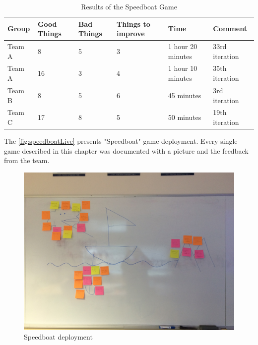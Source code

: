 \begin{table}[!htbp]
	\caption{Results of the Speedboat Game}
	\label{tab:groups-speedTeamResultsN}
	\begin{tabularx}{\textwidth}{|X|X|X|X|X|X|}
	\hline
		Group & Good Things & Bad Things & Things to improve & Time & Comment\\ \hline
		Team A & 8 & 5 & 3 & 1 hour 20 minutes & 33rd iteration \\ \hline
		Team A & 16 & 3 & 4 & 1 hour 10 minutes & 35th iteration\\ \hline
		Team B & 8 & 5 & 6 & 45 minutes & 3rd iteration\\ \hline
        Team C & 17 & 8 & 5 & 50 minutes & 19th iteration\\ \hline
	\end{tabularx}
\end{table}

The \autoref{fig:speedboatLive} presents "Speedboat" game deployment. Every single game described in this chapter was documented with a picture and the feedback from the team.

\begin{figure}[!htbp]
\caption{Speedboat deployment}
\label{fig:speedboatLive}
\centering
\includegraphics[width=1\textwidth]{live/speedboatLive}
\end{figure}

